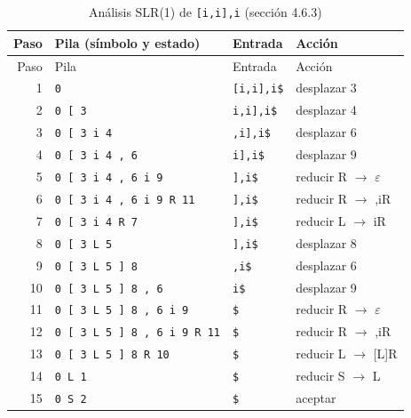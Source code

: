 \documentclass[11pt,a4paper]{article}
\begin{document}
\begin{longtable}{r p{4.6cm} p{2.6cm} p{5cm}}
\caption{Análisis SLR(1) de \texttt{{[}i,i{]},i} (sección 4.6.3)}\\
\toprule
Paso & Pila (símbolo y estado) & Entrada & Acción \\
\midrule
\endfirsthead
\toprule
Paso & Pila & Entrada & Acción \\
\midrule
\endhead
1 & \texttt{0} & \texttt{{[}i,i{]},i\$} & desplazar 3 \\
2 & \texttt{0 {[} 3} & \texttt{i,i{]},i\$} & desplazar 4 \\
3 & \texttt{0 {[} 3 i 4} & \texttt{,i{]},i\$} & desplazar 6 \\
4 & \texttt{0 {[} 3 i 4 , 6} & \texttt{i{]},i\$} & desplazar 9 \\
5 & \texttt{0 {[} 3 i 4 , 6 i 9} & \texttt{{]},i\$} & reducir R $\to$ $\varepsilon$ \\
6 & \texttt{0 {[} 3 i 4 , 6 i 9 R 11} & \texttt{{]},i\$} & reducir R $\to$ ,iR \\
7 & \texttt{0 {[} 3 i 4 R 7} & \texttt{{]},i\$} & reducir L $\to$ iR \\
8 & \texttt{0 {[} 3 L 5} & \texttt{{]},i\$} & desplazar 8 \\
9 & \texttt{0 {[} 3 L 5 {]} 8} & \texttt{,i\$} & desplazar 6 \\
10 & \texttt{0 {[} 3 L 5 {]} 8 , 6} & \texttt{i\$} & desplazar 9 \\
11 & \texttt{0 {[} 3 L 5 {]} 8 , 6 i 9} & \texttt{\$} & reducir R $\to$ $\varepsilon$ \\
12 & \texttt{0 {[} 3 L 5 {]} 8 , 6 i 9 R 11} & \texttt{\$} & reducir R $\to$ ,iR \\
13 & \texttt{0 {[} 3 L 5 {]} 8 R 10} & \texttt{\$} & reducir L $\to$ {[}L{]}R \\
14 & \texttt{0 L 1} & \texttt{\$} & reducir S $\to$ L \\
15 & \texttt{0 S 2} & \texttt{\$} & aceptar  \\
\bottomrule
\end{longtable}
\end{document}
